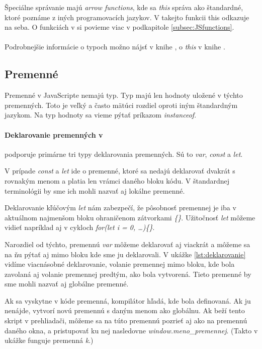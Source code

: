 Špeciálne správanie majú \emph{arrow functions}, kde sa \emph{this} správa ako štandardné, ktoré poznáme z iných programovacích jazykov. V takejto funkcii this odkazuje na seba.
O funkciách v \JS{} si povieme viac v podkapitole \ref{subsec:JSfunctions}.

\paragraph{}
Podrobnejšie informácie o typoch možno nájsť v knihe \cite[Types \& Grammar]{youDontKnowJS4}, o \emph{this} v knihe \cite[this \& Object Prototypes]{youDontKnowJS3}.

\subsection{Premenné}
Premenné v JavaScripte nemajú typ.  Typ majú len hodnoty uložené v týchto premenných. Toto je veľký a často mätúci rozdiel oproti iným štandardným jazykom. Na typ hodnoty sa vieme pýtať príkazom \emph{instanceof}.

\paragraph{Deklarovanie premenných v \JS{}}
\JS{} podporuje primárne tri typy deklarovania premenných. Sú to \emph{var}, \emph{const} a \emph{let}. 

V prípade \emph{const} a \emph{let} ide o premenné, ktoré sa nedajú deklarovať dvakrát s rovnakým menom a platia len vrámci daného bloku kódu. V štandardnej terminológii by sme ich mohli nazvať aj lokálne premenné. 

Deklarovanie kľúčovým \emph{let} nám zabezpečí, že pôsobnosť premennej je iba v aktuálnom najmenšom bloku ohraničenom zátvorkami \emph{\{\}}. Užitočnosť \emph{let} môžeme vidieť napríklad aj v cykloch \emph{for(let i = 0, \ldots)\{\}}.

Narozdiel od týchto, premennú \emph{var} môžeme deklarovať aj viackrát a môžeme sa na ňu pýtať aj mimo bloku kde sme ju deklarovali. V ukážke \ref{lst:deklarovanie} vidíme viacnásobné deklarovanie, volanie premennej mimo bloku, kde bola zavolaná aj volanie premennej predtým, ako bola vytvorená. Tieto premenné by sme mohli nazvať aj globálne premenné. 

Ak sa vyskytne v kóde premenná, kompilátor hľadá, kde bola definovaná. Ak ju nenájde, vytvorí novú premennú s daným menom ako globálnu. Ak beží tento skript v prehliadači, môžeme sa na túto premennú pozrieť aj ako na premennú daného okna, a pristupovať ku nej nasledovne \emph{window.meno\_premennej}. (Takto v ukážke funguje premenná \emph{k}.)

